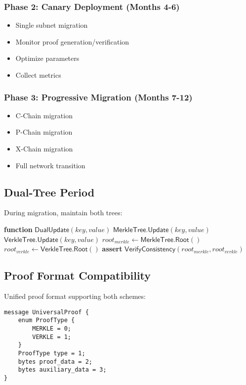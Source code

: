 \documentclass[11pt,a4paper]{article}
\theoremstyle{definition}
\begin{document}
\subsubsection{Phase 2: Canary Deployment (Months 4-6)}
\begin{itemize}
    \item Single subnet migration
    \item Monitor proof generation/verification
    \item Optimize parameters
    \item Collect metrics
\end{itemize}

\subsubsection{Phase 3: Progressive Migration (Months 7-12)}
\begin{itemize}
    \item C-Chain migration
    \item P-Chain migration
    \item X-Chain migration
    \item Full network transition
\end{itemize}

\subsection{Dual-Tree Period}

During migration, maintain both trees:
\begin{algorithmic}[1]
\STATE \textbf{function} $\mathsf{DualUpdate}(key, value)$
\STATE $\mathsf{MerkleTree.Update}(key, value)$
\STATE $\mathsf{VerkleTree.Update}(key, value)$
\STATE $root_{merkle} \gets \mathsf{MerkleTree.Root}()$
\STATE $root_{verkle} \gets \mathsf{VerkleTree.Root}()$
\STATE \textbf{assert} $\mathsf{VerifyConsistency}(root_{merkle}, root_{verkle})$
\end{algorithmic}

\subsection{Proof Format Compatibility}

Unified proof format supporting both schemes:
\begin{lstlisting}[caption=Universal Proof Format]
message UniversalProof {
    enum ProofType {
        MERKLE = 0;
        VERKLE = 1;
    }
    ProofType type = 1;
    bytes proof_data = 2;
    bytes auxiliary_data = 3;
}
\end{lstlisting}
\end{document}

